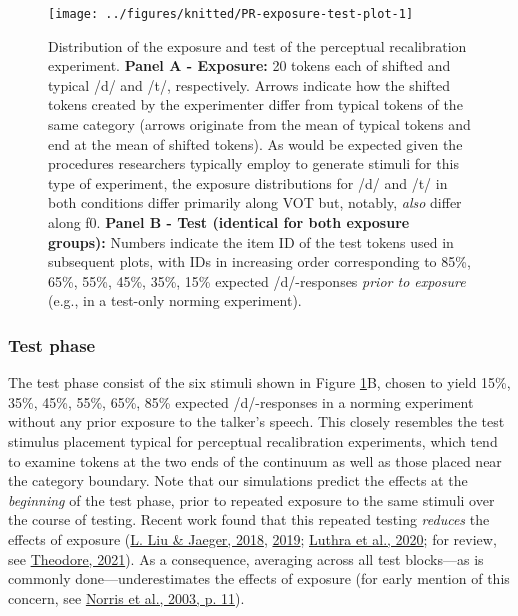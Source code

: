\documentclass[
  11pt,
  english,
  man,floatsintext]{apa6}
\begin{document}
\begin{figure}

{\centering \texttt{[image: ../figures/knitted/PR-exposure-test-plot-1]} 

}

\caption{Distribution of the exposure and test of the perceptual recalibration experiment. \textbf{Panel A - Exposure:} 20 tokens each of shifted and typical /d/ and /t/, respectively. Arrows indicate how the shifted tokens created by the experimenter differ from typical tokens of the same category (arrows originate from the mean of typical tokens and end at the mean of shifted tokens). As would be expected given the procedures researchers typically employ to generate stimuli for this type of experiment, the exposure distributions for /d/ and /t/ in both conditions differ primarily along VOT but, notably, \emph{also} differ along f0. \textbf{Panel B - Test (identical for both exposure groups):} Numbers indicate the item ID of the test tokens used in subsequent plots, with IDs in increasing order corresponding to 85\%, 65\%, 55\%, 45\%, 35\%, 15\% expected /d/-responses \emph{prior to exposure} (e.g., in a test-only norming experiment).}\label{fig:PR-exposure-test-plot}
\end{figure}

\hypertarget{test-phase}{%
\subsubsection{Test phase}\label{test-phase}}

The test phase consist of the six stimuli shown in Figure \ref{fig:PR-exposure-test-plot}B, chosen to yield 15\%, 35\%, 45\%, 55\%, 65\%, 85\% expected /d/-responses in a norming experiment without any prior exposure to the talker's speech. This closely resembles the test stimulus placement typical for perceptual recalibration experiments, which tend to examine tokens at the two ends of the continuum as well as those placed near the category boundary. Note that our simulations predict the effects at the \emph{beginning} of the test phase, prior to repeated exposure to the same stimuli over the course of testing. Recent work found that this repeated testing \emph{reduces} the effects of exposure (\protect\hyperlink{ref-liu-jaeger2018}{L. Liu \& Jaeger, 2018}, \protect\hyperlink{ref-liu-jaeger2019}{2019}; \protect\hyperlink{ref-luthra2020}{Luthra et al., 2020}; for review, see \protect\hyperlink{ref-theodore2021}{Theodore, 2021}). As a consequence, averaging across all test blocks---as is commonly done---underestimates the effects of exposure (for early mention of this concern, see \protect\hyperlink{ref-norris2003}{Norris et al., 2003, p. 11}).
\end{document}
